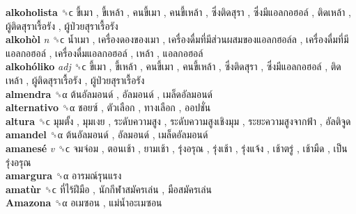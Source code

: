 \textbf{alkoholista} ␝ϲ   ขี้เมา ,  ขี้เหล้า ,  คนขี้เมา ,  คนขี้เหล้า ,  ซึ่งติดสุรา ,  ซึ่งมีแอลกอฮอล์ ,  ติดเหล้า ,  ผู้ติดสุราเรื้อรัง ,  ผู้ป่วยสุราเรื้อรัง   \\
\textbf{alkohòl} \emph{n}  ␝ϲ   น้ำเมา ,  เครื่องดองของเมา ,  เครื่องดื่มที่มีส่วนผสมของแอลกฮอล์ล ,  เครื่องดื่มที่มีแอลกอฮอล์ ,  เครื่องดื่มแอลกอฮอล์ ,  เหล้า ,  แอลกอฮอล์   \\
\textbf{alkohóliko} \emph{adj}  ␝ϲ   ขี้เมา ,  ขี้เหล้า ,  คนขี้เมา ,  คนขี้เหล้า ,  ซึ่งติดสุรา ,  ซึ่งมีแอลกอฮอล์ ,  ติดเหล้า ,  ผู้ติดสุราเรื้อรัง ,  ผู้ป่วยสุราเรื้อรัง   \\
\textbf{almendra} ␝α   ต้นอัลมอนด์ ,  อัลมอนด์ ,  เมล็ดอัลมอนด์   \\
\textbf{alternativo} ␝α   ชอยซ์ ,  ตัวเลือก ,  ทางเลือก ,  ออปชั่น   \\
\textbf{altura} ␝ϲ   มุมตั้ง ,  มุมเงย ,  ระดับความสูง ,  ระดับความสูงเชิงมุม ,  ระยะความสูงจากฟ้า ,  อัลติจูด   \\
\textbf{amandel} ␝α   ต้นอัลมอนด์ ,  อัลมอนด์ ,  เมล็ดอัลมอนด์   \\
\textbf{amanesé} \emph{v}  ␝ϲ   จมจ่อม ,  ตอนเช้า ,  ยามเช้า ,  รุ่งอรุณ ,  รุ่งเช้า ,  รุ่งแจ้ง ,  เช้าตรู่ ,  เช้ามืด ,  เป็นรุ่งอรุณ   \\
\textbf{amargura} ␝α   อารมณ์รุนแรง   \\
\textbf{amatùr} ␝ϲ   ที่ไร้ฝีมือ ,  นักกีฬาสมัครเล่น ,  มือสมัครเล่น   \\
\textbf{Amazona} ␝α   อเมซอน ,  แม่น้ำอะเมซอน   \\
